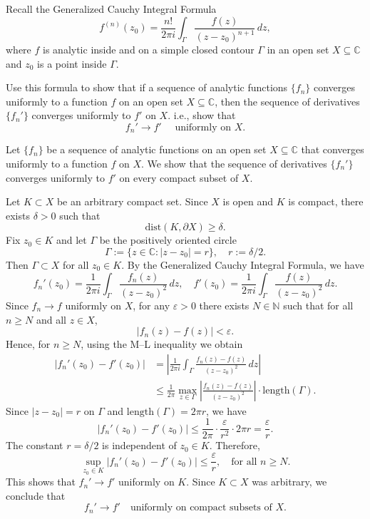 \documentclass{elegantbook}
\begin{document}
\begin{exercise} \label{sol:uniform_convergence_derivative}
  Recall the Generalized Cauchy Integral Formula
  \[
    f^{(n)}(z_0) = \frac{n!}{2\pi i} \int_{\Gamma} \frac{f(z)}{(z - z_0)^{n+1}} \, dz,
  \]
  where $f$ is analytic inside and on a simple closed contour $\Gamma$ in an open set $X \subseteq \mathbb{C}$ and $z_0$ is a point inside $\Gamma$.
  
  Use this formula to show that if a sequence of analytic functions $\{f_n\}$ converges uniformly to a function $f$ on an open set $X \subseteq \mathbb{C}$, then the sequence of derivatives $\{f_n'\}$ converges uniformly to $f'$ on $X$.
  i.e., show that
  \[
    f_n' \to f' \quad \text{ uniformly on } X.
  \]
\end{exercise}

\begin{solution}
  Let $\{f_n\}$ be a sequence of analytic functions on an open set $X \subseteq \mathbb{C}$ that converges uniformly to a function $f$ on $X$. We show that the sequence of derivatives $\{f_n'\}$ converges uniformly to $f'$ on every compact subset of $X$.

  Let $K \subset X$ be an arbitrary compact set. Since $X$ is open and $K$ is compact, there exists $\delta > 0$ such that
  \[
    \mathrm{dist}(K, \partial X) \ge \delta.
  \]
  Fix $z_0 \in K$ and let $\Gamma$ be the positively oriented circle
  \[
    \Gamma := \{ z \in \mathbb{C} : |z - z_0| = r \}, \quad r := \delta/2.
  \]
  Then $\Gamma \subset X$ for all $z_0 \in K$. By the Generalized Cauchy Integral Formula, we have
  \[
    f_n'(z_0) = \frac{1}{2\pi i} \int_{\Gamma} \frac{f_n(z)}{(z - z_0)^2} \, dz, \quad f'(z_0) = \frac{1}{2\pi i} \int_{\Gamma} \frac{f(z)}{(z - z_0)^2} \, dz.
  \]
  Since $f_n \to f$ uniformly on $X$, for any $\varepsilon > 0$ there exists $N \in \mathbb{N}$ such that for all $n \ge N$ and all $z \in X$,
  \[
    |f_n(z) - f(z)| < \varepsilon.
  \]
  Hence, for $n \ge N$, using the M--L inequality we obtain
  \[
  \begin{aligned}
    |f_n'(z_0) - f'(z_0)| &= \left| \frac{1}{2\pi i}\int_{\Gamma} \frac{f_n(z) - f(z)}{(z - z_0)^2} \, dz \right| \\
                          &\le \frac{1}{2\pi} \max_{z \in \Gamma} \left| \frac{f_n(z) - f(z)}{(z - z_0)^2} \right|\cdot \mathrm{length}(\Gamma).
  \end{aligned}
  \]
  Since $|z - z_0| = r$ on $\Gamma$ and $\mathrm{length}(\Gamma) = 2\pi r$,
  we have
  \[
    |f_n'(z_0) - f'(z_0)| \le \frac{1}{2\pi} \cdot \frac{\varepsilon}{r^2} \cdot 2\pi r = \frac{\varepsilon}{r}.
  \]
  The constant $r = \delta/2$ is independent of $z_0 \in K$. Therefore,
  \[
    \sup_{z_0 \in K} |f_n'(z_0) - f'(z_0)| \le \frac{\varepsilon}{r}, \quad \text{for all } n \ge N.
  \]
  This shows that $f_n' \to f'$ uniformly on $K$. Since $K \subset X$ was arbitrary, we conclude that
  \[
    f_n' \to f' \quad \text{uniformly on compact subsets of } X.
  \]
\end{solution}
\end{document}
